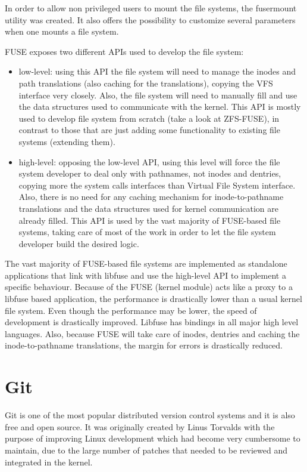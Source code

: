         In order to allow non privileged users to mount the file systems, the fusermount utility was created. It also offers the possibility to customize several parameters when one mounts a file system.
        
        FUSE exposes two different APIs used to develop the file system:
        \begin{itemize}
            \item low-level: using this API the file system will need to manage the inodes and path translations (also caching for the translations), copying the VFS interface very closely. Also, the file system will need to manually fill and use the data structures used to communicate with the kernel. This API is mostly used to develop file system from scratch (take a look at ZFS-FUSE), in contrast to those that are just adding some functionality to existing file systems (extending them). 
            \item high-level: opposing the low-level API, using this level will force the file system developer to deal only with pathnames, not inodes and dentries, copying more the system calls interfaces than Virtual File System interface. Also, there is no need for any caching mechanism for inode-to-pathname translations and the data structures used for kernel communication are already filled. This API is used by the vast majority of FUSE-based file systems, taking care of most of the work in order to let the file system developer build the desired logic.
        \end{itemize}
        
        The vast majority of FUSE-based file systems are implemented as standalone applications that link with libfuse and use the high-level API to implement a specific behaviour. Because of the FUSE (kernel module) acts like a proxy to a libfuse based application, the performance is drastically lower than a usual kernel file system. Even though the performance may be lower, the speed of development is drastically improved. Libfuse has bindings in all major high level languages. Also, because FUSE will take care of inodes, dentries and caching the inode-to-pathname translations, the margin for errors is drastically reduced.
        
\section{Git}
    Git is one of the most popular distributed version control systems and it is also free and open source. It was originally created by Linus Torvalds with the purpose of improving Linux development which had become very cumbersome to maintain, due to the large number of patches that needed to be reviewed and integrated in the kernel.
    

